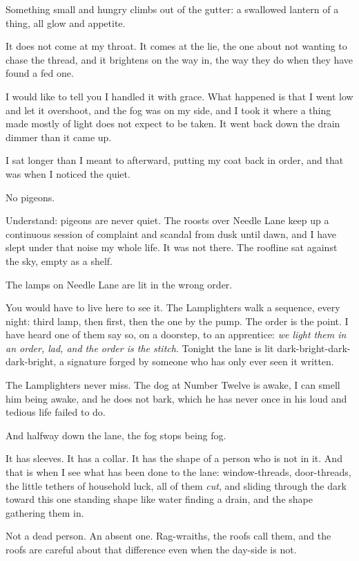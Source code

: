 Something small and hungry climbs out of the gutter: a swallowed lantern of a thing, all glow and appetite.

It does not come at my throat. It comes at the lie, the one about not wanting to chase the thread, and it brightens on the way in, the way they do when they have found a fed one.

I would like to tell you I handled it with grace. What happened is that I went low and let it overshoot, and the fog was on my side, and I took it where a thing made mostly of light does not expect to be taken. It went back down the drain dimmer than it came up.

I sat longer than I meant to afterward, putting my coat back in order, and that was when I noticed the quiet.

No pigeons.

Understand: pigeons are never quiet. The roosts over Needle Lane keep up a continuous session of complaint and scandal from dusk until dawn, and I have slept under that noise my whole life. It was not there. The roofline sat against the sky, empty as a shelf.

\scenebreak

The lamps on Needle Lane are lit in the wrong order.

You would have to live here to see it. The Lamplighters walk a sequence, every night: third lamp, then first, then the one by the pump. The order is the point. I have heard one of them say so, on a doorstep, to an apprentice: \emph{we light them in an order, lad, and the order is the stitch}. Tonight the lane is lit dark-bright-dark-dark-bright, a signature forged by someone who has only ever seen it written.

The Lamplighters never miss. The dog at Number Twelve is awake, I can smell him being awake, and he does not bark, which he has never once in his loud and tedious life failed to do.

And halfway down the lane, the fog stops being fog.

It has sleeves. It has a collar. It has the shape of a person who is not in it. And that is when I see what has been done to the lane: window-threads, door-threads, the little tethers of household luck, all of them \emph{cut}, and sliding through the dark toward this one standing shape like water finding a drain, and the shape gathering them in.

Not a dead person. An absent one. Rag-wraiths, the roofs call them, and the roofs are careful about that difference even when the day-side is not.

